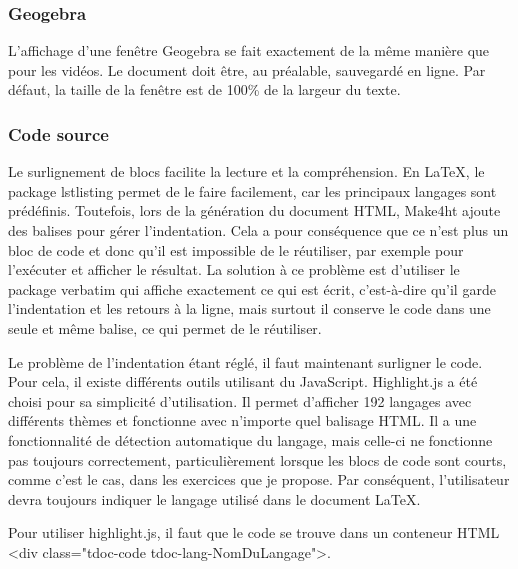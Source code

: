 \documentclass[12pt,titlepage,oneside]{article}
\renewcommand{\cite}[1]{}
\begin{document}
\subsubsection{Geogebra}
L'affichage d'une fenêtre Geogebra \cite{geogebra} se fait exactement de la même manière que pour les vidéos. Le document doit être, au préalable, sauvegardé en ligne. Par défaut, la taille de la fenêtre est de 100\% de la largeur du texte.

\subsubsection{Code source}
Le surlignement de blocs facilite la lecture et la compréhension. En LaTeX, le package lstlisting permet de le faire facilement, car les principaux langages sont prédéfinis. Toutefois, lors de la génération du document HTML, Make4ht ajoute des balises pour gérer l'indentation. Cela a pour conséquence que ce n'est plus un bloc de code et donc qu'il est impossible de le réutiliser, par exemple pour l'exécuter et afficher le résultat. La solution à ce problème est d'utiliser le package verbatim qui affiche exactement ce qui est écrit, c'est-à-dire qu'il garde l'indentation et les retours à la ligne, mais surtout il conserve le code dans une seule et même balise, ce qui permet de le réutiliser.\par
Le problème de l'indentation étant réglé, il faut maintenant surligner le code. Pour cela, il existe différents outils utilisant du JavaScript. Highlight.js \cite{highlightjs} a été choisi pour sa simplicité d'utilisation. Il permet d'afficher 192 langages avec différents thèmes et fonctionne avec n'importe quel balisage HTML. Il a une fonctionnalité de détection automatique du langage, mais celle-ci ne fonctionne pas toujours correctement, particulièrement lorsque les blocs de code sont courts, comme c'est le cas, dans les exercices que je propose. Par conséquent, l'utilisateur devra toujours indiquer le langage utilisé dans le document LaTeX.\par
Pour utiliser highlight.js, il faut que le code se trouve dans un conteneur HTML <div class="tdoc-code tdoc-lang-NomDuLangage">.\par
\end{document}
